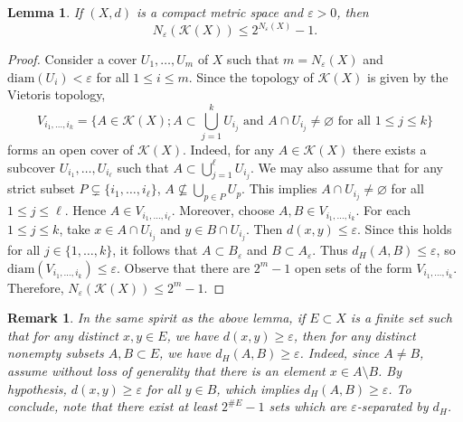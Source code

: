 \documentclass[sn-mathphys-num]{sn-jnl}%
\theoremstyle{thmstyleone}%
\newtheorem{lemma}{Lemma}
\theoremstyle{thmstyletwo}%
\newtheorem{remark}{Remark}%
\theoremstyle{thmstylethree}%
\newcommand*\hyp[1]{\mathcal{#1}}
\begin{document}
\begin{lemma}\label{lemma:number-cover-epsilon-hyperspace-exponential-upper-bound}
    If $(X, d)$ is a compact metric space and $\varepsilon > 0$, then
    \begin{equation}\label{eq:upper-bound-number-cover-hyperspace}
        N_\varepsilon(\hyp{K}(X)) \leq 2^{N_\varepsilon(X)} - 1.
    \end{equation}
\end{lemma}
\begin{proof}
    Consider a cover $U_1, \ldots, U_m$ of $X$ such that $m = N_\varepsilon(X)$ and $\text{diam}(U_i) < \varepsilon$ for all $1 \leq i \leq m$. Since the topology of $\hyp{K}(X)$ is given by the Vietoris topology, 
    \begin{equation*}
        V_{i_1, \ldots, i_k} = \{A \in \hyp{K}(X); A \subset \bigcup_{j = 1}^k U_{i_j} \text{ and } A \cap U_{i_j} \neq \varnothing \text{ for all } 1 \leq j \leq k\}
    \end{equation*}
    forms an open cover of $\hyp{K}(X)$. Indeed, for any $A \in \hyp{K}(X)$ there exists a subcover $U_{i_1}, \ldots, U_{i_\ell}$ such that $A \subset \bigcup_{j = 1}^\ell U_{i_j}$. We may also assume that for any strict subset $P \subsetneq \{i_1, \ldots, i_\ell\}$, $A \nsubseteq \bigcup_{p \in P} U_{p}$. This implies $A \cap U_{i_j} \neq \varnothing$ for all $1 \leq j \leq \ell$. Hence $A \in V_{i_1, \ldots, i_\ell}$. Moreover, choose $A, B \in V_{i_1, \ldots, i_k}$. For each $1 \leq j \leq k$, take $x \in A \cap U_{i_j}$ and $y \in B \cap U_{i_j}$. Then $d(x, y) \leq \varepsilon$. Since this holds for all $j \in \{1, \ldots, k\}$, it follows that $A \subset B_\varepsilon$ and $B \subset A_\varepsilon$. Thus $d_H(A, B) \leq \varepsilon$, so $\text{diam}(V_{i_1, \ldots, i_k}) \leq \varepsilon$. Observe that there are $2^m - 1$ open sets of the form $V_{i_1, \ldots, i_k}$. Therefore, $N_\varepsilon(\hyp{K}(X)) \leq 2^m - 1$. 
\end{proof}

\begin{remark}\label{rmk:separated-sets-hyperspace}
In the same spirit as the above lemma, if $E \subset X$ is a finite set such that for any distinct $x, y \in E$, we have $d(x, y) \geq \varepsilon$, then for any distinct nonempty subsets $A, B \subset E$, we have $d_H(A, B) \geq \varepsilon$. Indeed, since $A \neq B$, assume without loss of generality that there is an element $x \in A \setminus B$. By hypothesis, $d(x,y) \geq \varepsilon$ for all $y \in B$, which implies $d_H(A,B) \geq \varepsilon$. To conclude, note that there exist at least $2^{\#E} - 1$ sets which are $\varepsilon$-separated by $d_H$.\\
\end{remark}
\end{document}
